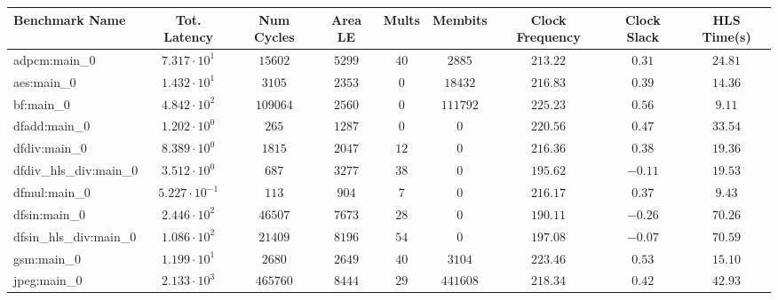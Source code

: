 \begin{tabular}{|l|c|c|c|c|c|c|c|c|}
\hline
Benchmark Name          & Tot. Latency            & Num Cycles & Area LE   & Mults   & Membits    & Clock Frequency & Clock Slack & HLS Time(s) \\
\hline
adpcm:main\_0           & $ 7.317 \cdot 10^{1}  $ & $ 15602  $ & $ 5299  $ & $ 40  $ & $ 2885   $ & $ 213.22      $ & $ 0.31    $ & $ 24.81   $ \\
aes:main\_0             & $ 1.432 \cdot 10^{1}  $ & $ 3105   $ & $ 2353  $ & $ 0   $ & $ 18432  $ & $ 216.83      $ & $ 0.39    $ & $ 14.36   $ \\
bf:main\_0              & $ 4.842 \cdot 10^{2}  $ & $ 109064 $ & $ 2560  $ & $ 0   $ & $ 111792 $ & $ 225.23      $ & $ 0.56    $ & $ 9.11    $ \\
dfadd:main\_0           & $ 1.202 \cdot 10^{0}  $ & $ 265    $ & $ 1287  $ & $ 0   $ & $ 0      $ & $ 220.56      $ & $ 0.47    $ & $ 33.54   $ \\
dfdiv:main\_0           & $ 8.389 \cdot 10^{0}  $ & $ 1815   $ & $ 2047  $ & $ 12  $ & $ 0      $ & $ 216.36      $ & $ 0.38    $ & $ 19.36   $ \\
dfdiv\_hls\_div:main\_0 & $ 3.512 \cdot 10^{0}  $ & $ 687    $ & $ 3277  $ & $ 38  $ & $ 0      $ & $ 195.62      $ & $ -0.11   $ & $ 19.53   $ \\
dfmul:main\_0           & $ 5.227 \cdot 10^{-1} $ & $ 113    $ & $ 904   $ & $ 7   $ & $ 0      $ & $ 216.17      $ & $ 0.37    $ & $ 9.43    $ \\
dfsin:main\_0           & $ 2.446 \cdot 10^{2}  $ & $ 46507  $ & $ 7673  $ & $ 28  $ & $ 0      $ & $ 190.11      $ & $ -0.26   $ & $ 70.26   $ \\
dfsin\_hls\_div:main\_0 & $ 1.086 \cdot 10^{2}  $ & $ 21409  $ & $ 8196  $ & $ 54  $ & $ 0      $ & $ 197.08      $ & $ -0.07   $ & $ 70.59   $ \\
gsm:main\_0             & $ 1.199 \cdot 10^{1}  $ & $ 2680   $ & $ 2649  $ & $ 40  $ & $ 3104   $ & $ 223.46      $ & $ 0.53    $ & $ 15.10   $ \\
jpeg:main\_0            & $ 2.133 \cdot 10^{3}  $ & $ 465760 $ & $ 8444  $ & $ 29  $ & $ 441608 $ & $ 218.34      $ & $ 0.42    $ & $ 42.93   $ \\

\end{tabular}
